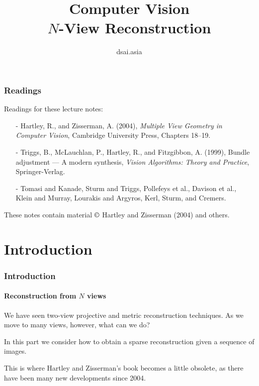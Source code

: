 \documentclass[aspectratio=169]{beamer}
\title[Computer Vision]{Computer Vision\\$N$-View Reconstruction}
\author{dsai.asia}
\institute[]{Asia Data Science and Artificial Intelligence Master's Program}
\date{}
\begin{document}


\frame{\titlepage}

%

\begin{frame}
\frametitle{Readings}

Readings for these lecture notes:
\begin{itemize}
\item[-] Hartley, R., and Zisserman, A. (2004), {\em Multiple View Geometry in
  Computer Vision}, Cambridge University Press, Chapters 18--19.
\item[-] Triggs, B., McLauchlan, P., Hartley, R., and Fitzgibbon,
  A. (1999), Bundle adjustment --- A modern synthesis, \textit{Vision
    Algorithms: Theory and Practice}, Springer-Verlag.
\item[-] Tomasi and Kanade, Sturm and Triggs, Pollefeys et al.,
  Davison et al., Klein and Murray, Lourakis and Argyros, Kerl, Sturm,
  and Cremers.
\end{itemize}

These notes contain material $\copyright$ Hartley and Zisserman
(2004) and others.

\end{frame}

\section{Introduction}

\begin{frame}
\frametitle{Introduction}
\framesubtitle{Reconstruction from $N$ views}

We have seen two-view projective and metric reconstruction techniques.
As we move to many views, however, what can we do?

\medskip

In this part we consider how to obtain a sparse
reconstruction given a \alert{sequence} of images.

\medskip

This is where Hartley and Zisserman's book becomes a little obsolete,
as there have been many new developments since 2004.

\end{frame}
\end{document}
